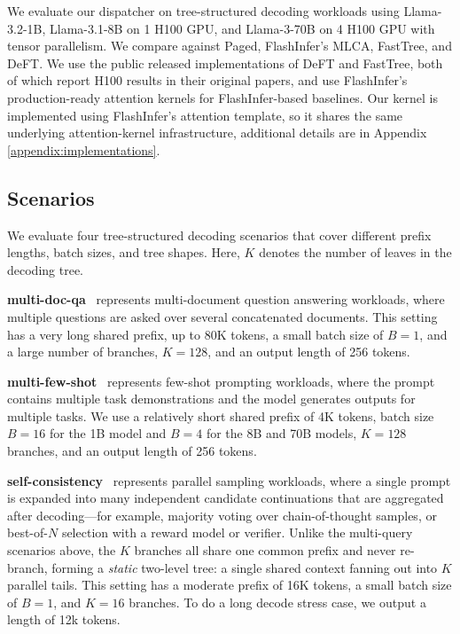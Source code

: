 \documentclass[11pt]{article}
\begin{document}
We evaluate our dispatcher on tree-structured decoding workloads using
Llama-3.2-1B, Llama-3.1-8B on 1 H100 GPU, and Llama-3-70B on 4 H100 GPU with tensor parallelism. We compare against Paged, FlashInfer's MLCA,
FastTree, and DeFT. We use the public released implementations of DeFT and FastTree, both of which report H100 results in their original papers, and use FlashInfer’s production-ready attention kernels for FlashInfer-based baselines. Our kernel is implemented using FlashInfer’s attention template, so it shares the same underlying attention-kernel infrastructure, additional details are in Appendix \ref{appendix:implementations}.

\subsection{Scenarios}
We evaluate four tree-structured decoding scenarios that cover different prefix lengths, batch sizes, and tree shapes. 
Here, $K$ denotes the number of leaves in the decoding tree.

\textbf{multi-doc-qa}~\cite{yang2018hotpotqa,10.1145/3701716.3715490} represents multi-document question answering workloads, where multiple questions are asked over several concatenated documents. This setting has a very long shared prefix, up to 80K tokens, a small batch size of $B=1$, and a large number of branches, $K=128$, and an output length of 256 tokens.

\textbf{multi-few-shot}~\cite{10.5555/3495724.3495883} represents few-shot prompting workloads, where the prompt contains multiple task demonstrations and the model generates outputs for multiple tasks. We use a relatively short shared prefix of 4K tokens, batch size $B=16$ for the 1B model and $B=4$ for the 8B and 70B models, $K=128$ branches, and an output length of 256 tokens.

\textbf{self-consistency}~\cite{wang2023selfconsistencyimproveschainthought} represents parallel
  sampling workloads, where a single prompt is expanded into many independent
  candidate continuations that are aggregated after decoding---for example,
  majority voting over chain-of-thought samples, or best-of-$N$ selection with a
  reward model or verifier. Unlike the multi-query scenarios above, the $K$
  branches all share one common prefix and never re-branch, forming a
  \emph{static} two-level tree: a single shared context fanning out into $K$
  parallel tails. This setting has a moderate prefix of 16K tokens, a small batch
  size of $B=1$, and $K=16$ branches. To do a  long decode stress case, we output a length of 12k tokens.
  
\end{document}
